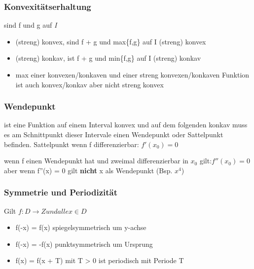 
\subsubsection{Konvexitätserhaltung}
\begin{definition}
    [Konvexitätserhaltend] sind f und g auf \textit{I}
    \begin{itemize}
        \item (streng) konvex, sind f + g und max\{f,g\} auf I
        (streng) konvex
        \item (streng) konkav, ist f + g und min\{f,g\} auf I
        (streng) konkav
        \item max einer konvexen/konkaven und einer streng konvexen/konkaven
        Funktion ist auch konvex/konkav aber nicht streng
        konvex
    \end{itemize} 
\end{definition} 


\subsubsection{Wendepunkt}
\begin{definition}
     ist eine Funktion auf einem
    Interval konvex und auf dem folgenden konkav muss es am
    Schnittpunkt dieser Intervale einen Wendepunkt oder
    Sattelpunkt befinden. Sattelpunkt wenn f differenzierbar: $f'(x_0) = 0$
\end{definition}

\begin{theorem}
     wenn f einen Wendepunkt hat und zweimal differenzierbar in
    $x_0$ gilt:$f''(x_0) = 0 $ aber wenn f''(x) = 0 gilt
    \textbf{nicht} x als Wendepunkt (Bsp. $x^4$)
\end{theorem}

\subsubsection{Symmetrie und Periodizität}

\begin{definition}
    [Symmetrie] Gilt $f: D \rightarrow Z und alle x \in D$
    \begin{itemize}
        \item f(-x) = f(x) spiegelsymmetrisch um y-achse
        \item f(-x) = -f(x) punktsymmetrisch um Ursprung
        \item f(x) = f(x + T) mit T > 0 ist periodisch mit
        Periode T
    \end{itemize} 

\end{definition}

